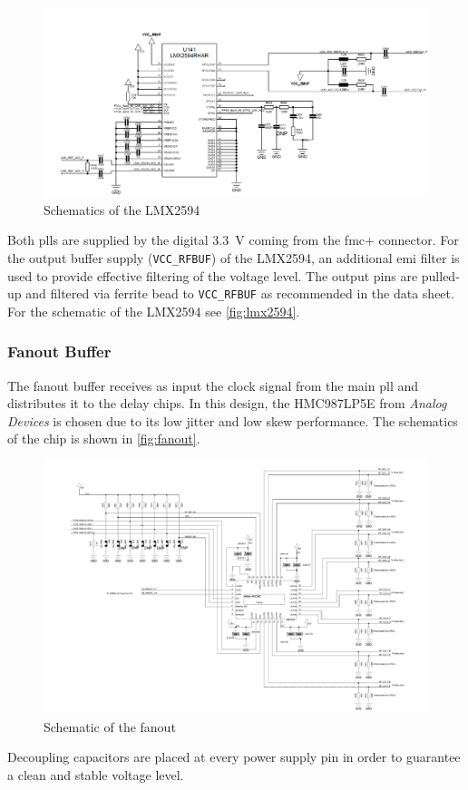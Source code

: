 \begin{figure}[tb]
	\centering
	\includegraphics[width = \textwidth]{chap/04-theresa/img/schematic/lmx2594}
	\caption{Schematics of the LMX2594}
	\label{fig:lmx2594}
\end{figure}

Both \glspl{pll} are supplied by the digital \SI{3.3}{\volt} coming from the \gls{fmc}+ connector.
For the output buffer supply (\texttt{VCC\_RFBUF}) of the LMX2594, an additional \gls{emi} filter is used to provide effective filtering of the voltage level.
The output pins are pulled-up and filtered via ferrite bead to \texttt{VCC\_RFBUF} as recommended in the data sheet.
For the schematic of the LMX2594 see \autoref{fig:lmx2594}.

\subsubsection*{Fanout Buffer}
The fanout buffer receives as input the clock signal from the main \gls{pll} and distributes it to the delay chips.
In this design, the HMC987LP5E from \textit{Analog Devices} is chosen due to its low jitter and low skew performance. 
The schematics of the chip is shown in \autoref{fig:fanout}.

\begin{figure}[tb]
	\centering
	\includegraphics[width = \textwidth]{chap/04-theresa/img/schematic/fanout}
	\caption{Schematic of the fanout}
	\label{fig:fanout}
\end{figure}
Decoupling capacitors are placed at every power supply pin in order to guarantee a clean and stable voltage level.


